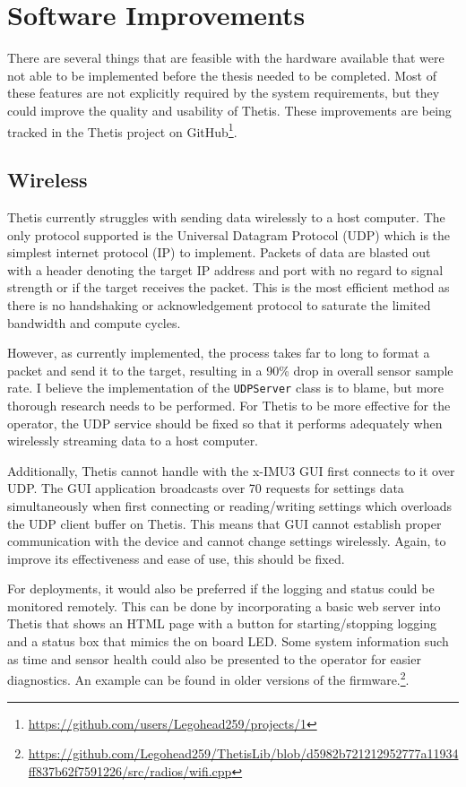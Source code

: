\section{Software Improvements} 
There are several things that are feasible with the hardware available that were not able to be implemented before the thesis needed to be completed.
Most of these features are not explicitly required by the system requirements, but they could improve the quality and usability of Thetis.
These improvements are being tracked in the Thetis project on GitHub\footnote{\url{https://github.com/users/Legohead259/projects/1}}.

\subsection{Wireless} 
Thetis currently struggles with sending data wirelessly to a host computer.
The only protocol supported is the Universal Datagram Protocol (UDP) which is the simplest internet protocol (IP) to implement.
Packets of data are blasted out with a header denoting the target IP address and port with no regard to signal strength or if the target receives the packet.
This is the most efficient method as there is no handshaking or acknowledgement protocol to saturate the limited bandwidth and compute cycles.

However, as currently implemented, the process takes far to long to format a packet and send it to the target, resulting in a 90\% drop in overall sensor sample rate.
I believe the implementation of the \lstinline[style=customInline]|UDPServer| class is to blame, but more thorough research needs to be performed.
For Thetis to be more effective for the operator, the UDP service should be fixed so that it performs adequately when wirelessly streaming data to a host computer.

Additionally, Thetis cannot handle with the x-IMU3 GUI first connects to it over UDP.
The GUI application broadcasts over 70 requests for settings data simultaneously when first connecting or reading/writing settings which overloads the UDP client buffer on Thetis.
This means that GUI cannot establish proper communication with the device and cannot change settings wirelessly.
Again, to improve its effectiveness and ease of use, this should be fixed.

For deployments, it would also be preferred if the logging and status could be monitored remotely.
This can be done by incorporating a basic web server into Thetis that shows an HTML page with a button for starting/stopping logging and a status box that mimics the on board LED.
Some system information such as time and sensor health could also be presented to the operator for easier diagnostics.
An example can be found in older versions of the firmware.\footnote{\url{https://github.com/Legohead259/ThetisLib/blob/d5982b721212952777a11934ff837b62f7591226/src/radios/wifi.cpp}}.

